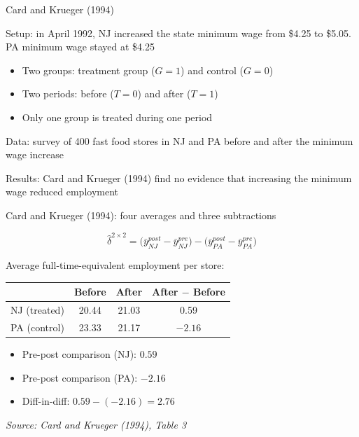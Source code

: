 \documentclass[compress, 8pt]{beamer}
\begin{document}
\begin{frame}{Card and Krueger (1994)}

Setup: in April 1992, NJ increased the state minimum wage from \$4.25 to \$5.05. PA minimum wage stayed at \$4.25
\begin{itemize}
    \item Two groups: treatment group ($G=1$) and control ($G=0$)
    \item Two periods: before ($T=0$) and after ($T=1$)
    \item Only one group is treated during one period
\end{itemize}

\vspace{2ex}
Data: survey of 400 fast food stores in NJ and PA before and after the minimum wage increase

\vspace{2ex}
Results: Card and Krueger (1994) find no evidence that increasing the minimum wage reduced employment

\end{frame}

\begin{frame}{Card and Krueger (1994): four averages and three subtractions}

\begin{equation*}
    \hat\delta^{2\times 2} = \big(\bar y_{NJ}^{post} - \bar y_{NJ}^{pre}\big) - \big(\bar y_{PA}^{post} - \bar y_{PA}^{pre}\big)
\end{equation*}

Average full-time-equivalent employment per store:
\begin{table}
\begin{tabular}{lccc}
\hline
 & \textbf{Before} & \textbf{After} & \textbf{After $-$ Before} \\
\hline\hline
NJ (treated)  & 20.44 & 21.03 & 0.59 \\
PA (control)  & 23.33 & 21.17 & $-2.16$ \\
\hline
\end{tabular}
\end{table}

\begin{itemize}
    \item Pre-post comparison (NJ): $0.59$
    \item Pre-post comparison (PA): $-2.16$
    \item Diff-in-diff: $0.59 - (-2.16) = \mathbf{2.76}$
\end{itemize}

\vspace{2ex}
\emph{Source: Card and Krueger (1994), Table 3}
\end{frame}
\end{document}
